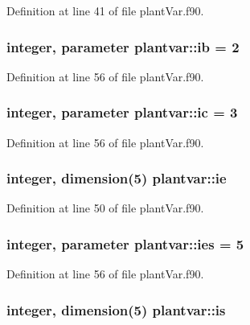 Definition at line 41 of file plant\-Var.\-f90.

\hypertarget{classplantvar_a234a52fa723b1234d3725b82c81dad0f}{
\subsubsection[{ib}]{\setlength{\rightskip}{0pt plus 5cm}integer, parameter plantvar\-::ib = 2}}\label{classplantvar_a234a52fa723b1234d3725b82c81dad0f}


Definition at line 56 of file plant\-Var.\-f90.

\hypertarget{classplantvar_a395505b74fbf30b4c496601cbd47a64b}{
\subsubsection[{ic}]{\setlength{\rightskip}{0pt plus 5cm}integer, parameter plantvar\-::ic = 3}}\label{classplantvar_a395505b74fbf30b4c496601cbd47a64b}


Definition at line 56 of file plant\-Var.\-f90.

\hypertarget{classplantvar_afa98042e93464d6b9c62a51103cd299f}{
\subsubsection[{ie}]{\setlength{\rightskip}{0pt plus 5cm}integer, dimension(5) plantvar\-::ie}}\label{classplantvar_afa98042e93464d6b9c62a51103cd299f}


Definition at line 50 of file plant\-Var.\-f90.

\hypertarget{classplantvar_afd5b160dbbf007015da33b4011f36c83}{
\subsubsection[{ies}]{\setlength{\rightskip}{0pt plus 5cm}integer, parameter plantvar\-::ies = 5}}\label{classplantvar_afd5b160dbbf007015da33b4011f36c83}


Definition at line 56 of file plant\-Var.\-f90.

\hypertarget{classplantvar_ab7276bde0d7595d7ce2ef0470ad21ca9}{
\subsubsection[{is}]{\setlength{\rightskip}{0pt plus 5cm}integer, dimension(5) plantvar\-::is}}\label{classplantvar_ab7276bde0d7595d7ce2ef0470ad21ca9}


